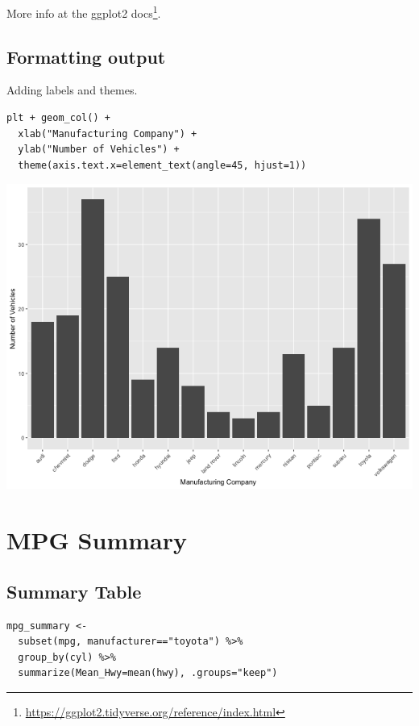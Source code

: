 \documentclass[11pt]{article}
\begin{document}
More info at the ggplot2 docs\footnote{\url{https://ggplot2.tidyverse.org/reference/index.html}}.

\subsection{Formatting output}
\label{sec:org880347f}

Adding labels and themes.

\begin{verbatim}
plt + geom_col() +
  xlab("Manufacturing Company") +
  ylab("Number of Vehicles") +
  theme(axis.text.x=element_text(angle=45, hjust=1))
\end{verbatim}

\begin{org}
\begin{center}
\includegraphics[width=.9\linewidth]{./resources/mpg3.png}
\end{center}
\end{org}

\section{MPG Summary}
\label{sec:org644a67c}

\subsection{Summary Table}
\label{sec:orgc89d1d2}

\begin{verbatim}
mpg_summary <-
  subset(mpg, manufacturer=="toyota") %>%
  group_by(cyl) %>%
  summarize(Mean_Hwy=mean(hwy), .groups="keep")
\end{verbatim}
\end{document}
